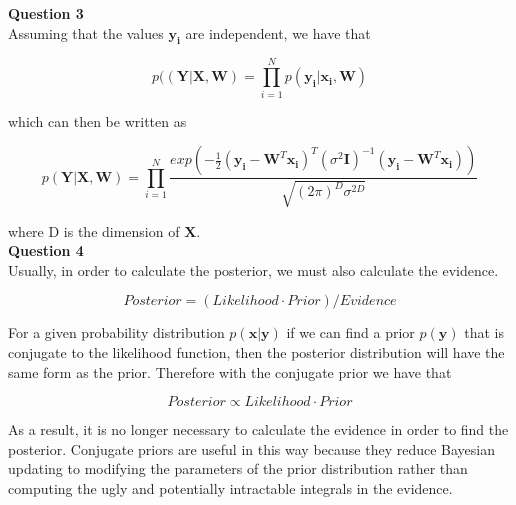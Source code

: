 \documentclass[10pt, a4paper, twocolumn]{article} %
\begin{document}
\begin{enumerate}
\textbf{Question 3}\\
Assuming that the values $\mathbf{y_i}$ are independent, we have that
  
  \begin{equation}
      p(\left(\mathbf{Y}|\mathbf{X},\mathbf{W}\right ) = \prod_{i = 1}^N p(\mathbf{y_i}|\mathbf{x_i}, \mathbf{W})
  \end{equation}
  
  which can then be written as 
  
  \begin{equation}
   p(\mathbf{Y}|\mathbf{X},\mathbf{W}) = \prod_{i = 1}^N \frac{exp(-\frac{1}{2}(\mathbf{y_i} - \textbf{W}^{T}\mathbf{x_i})^{T}(\sigma^{2}\textbf{I})^{-1}(\mathbf{y_i} - \textbf{W}^{T}\mathbf{x_i}))}{\sqrt{(2\pi)^D \sigma^{2D}}}
  \end{equation}
  
  where D is the dimension of $\mathbf{X}$.\\
  
  
  \textbf{Question 4}\\
  Usually, in order to calculate the posterior, we must also calculate the evidence.
  
  \begin{equation}
  Posterior = (Likelihood \cdot Prior)/Evidence
  \end{equation}
  
  For a given probability distribution $p(\mathbf{x}|\mathbf{y})$ if we can find a prior $p(\mathbf{y})$ that is conjugate to the likelihood function, then the posterior distribution will have the same form as the prior. Therefore with the conjugate prior we have that
  
  \begin{equation}
  Posterior \propto Likelihood \cdot Prior
  \end{equation}
  
   As a result, it is no longer necessary to calculate the evidence in order to find the posterior. Conjugate priors are useful in this way because they reduce Bayesian updating to modifying the parameters of the prior distribution rather than computing the ugly and potentially intractable integrals in the evidence.\\
  

\end{enumerate}
\end{document}

